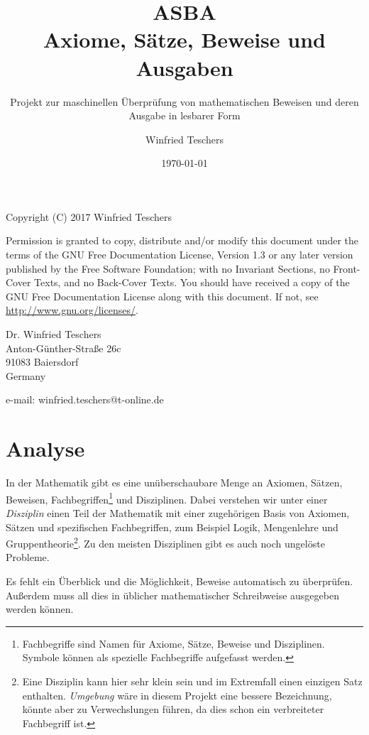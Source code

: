 \documentclass[english,ngerman,parskip=half,headsepline,footsepline]{scrreprt}
\title{ASBA\\Axiome, Sätze, Beweise und Ausgaben}
\subtitle{Projekt zur maschinellen Überprüfung von mathematischen Beweisen und deren Ausgabe in lesbarer Form}
\author{Winfried Teschers}
\date{\today}
\begin{document}
	\maketitle
	\tableofcontents	
	\vfill
	Copyright (C) 2017  Winfried Teschers
	
	\vspace{12pt}
	Permission is granted to copy, distribute and/or modify this document under the terms of the GNU Free Documentation License, Version 1.3 or any later version published by the Free Software Foundation; with no Invariant Sections, no Front-Cover Texts, and no Back-Cover Texts. You should have received a copy of the GNU Free Documentation License along with this document.  If not, see \url{http://www.gnu.org/licenses/}.
	\vspace{12pt}
	
	Dr. Winfried Teschers\\
	Anton-Günther-Straße 26c\\
	91083 Baiersdorf\\
	Germany
	
	e-mail: winfried.teschers@t-online.de\par
	
	\thispagestyle{scrheadings}
	
	
	
	\chapter{Analyse}
	\thispagestyle{scrheadings}
	
	In der Mathematik gibt es eine unüberschaubare Menge an Axiomen, Sätzen, Beweisen, Fachbegriffen\footnote{ Fachbegriffe sind Namen für Axiome, Sätze, Beweise und Disziplinen. Symbole können als spezielle Fachbegriffe aufgefasst werden.} und Disziplinen. Dabei verstehen wir unter einer \emph{Disziplin} einen Teil der Mathematik  mit einer zugehörigen Basis von Axiomen, Sätzen und spezifischen Fachbegriffen, zum Beispiel Logik, Mengenlehre und Gruppentheorie\footnote{ Eine Disziplin kann hier sehr klein sein und im Extremfall einen einzigen Satz enthalten. \emph{Umgebung} wäre in diesem Projekt eine bessere Bezeichnung, könnte aber zu Verwechslungen führen, da dies schon ein verbreiteter Fachbegriff ist.}. Zu den meisten Disziplinen gibt es auch noch ungelöste Probleme.
	
	Es fehlt ein Überblick und die Möglichkeit, Beweise automatisch zu überprüfen. Außerdem muss all dies in üblicher mathematischer Schreibweise ausgegeben werden können.
	
\end{document}
